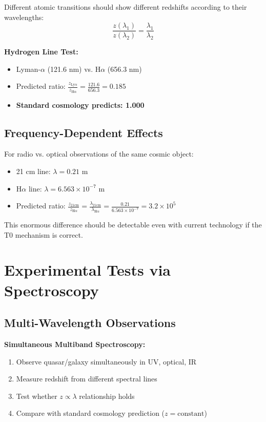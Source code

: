 \documentclass[12pt,a4paper]{article}
\theoremstyle{definition}
\begin{document}
	Different atomic transitions should show different redshifts according to their wavelengths:
	\begin{equation}
		\frac{z(\lambda_1)}{z(\lambda_2)} = \frac{\lambda_1}{\lambda_2}
	\end{equation}
	
	\begin{experiment}
		\textbf{Hydrogen Line Test:}
		\begin{itemize}
			\item Lyman-$\alpha$ (121.6 nm) vs. H$\alpha$ (656.3 nm)
			\item Predicted ratio: $\frac{z_{\text{Ly}\alpha}}{z_{\text{H}\alpha}} = \frac{121.6}{656.3} = 0.185$
			\item \textbf{Standard cosmology predicts: 1.000}
		\end{itemize}
	\end{experiment}
	
	\subsection{Frequency-Dependent Effects}
	
	For radio vs. optical observations of the same cosmic object:
	\begin{itemize}
		\item 21 cm line: $\lambda = 0.21$ m
		\item H$\alpha$ line: $\lambda = 6.563 \times 10^{-7}$ m
		\item Predicted ratio: $\frac{z_{21\text{cm}}}{z_{\text{H}\alpha}} = \frac{\lambda_{21\text{cm}}}{\lambda_{\text{H}\alpha}} = \frac{0.21}{6.563 \times 10^{-7}} = 3.2 \times 10^5$
	\end{itemize}
	
	This enormous difference should be detectable even with current technology if the T0 mechanism is correct.
	
	\section{Experimental Tests via Spectroscopy}
	\label{sec:experimental_tests}
	
	\subsection{Multi-Wavelength Observations}
	
	\begin{experiment}
		\textbf{Simultaneous Multiband Spectroscopy:}
		\begin{enumerate}
			\item Observe quasar/galaxy simultaneously in UV, optical, IR
			\item Measure redshift from different spectral lines
			\item Test whether $z \propto \lambda$ relationship holds
			\item Compare with standard cosmology prediction ($z = \text{constant}$)
		\end{enumerate}
	\end{experiment}
	
\end{document}
